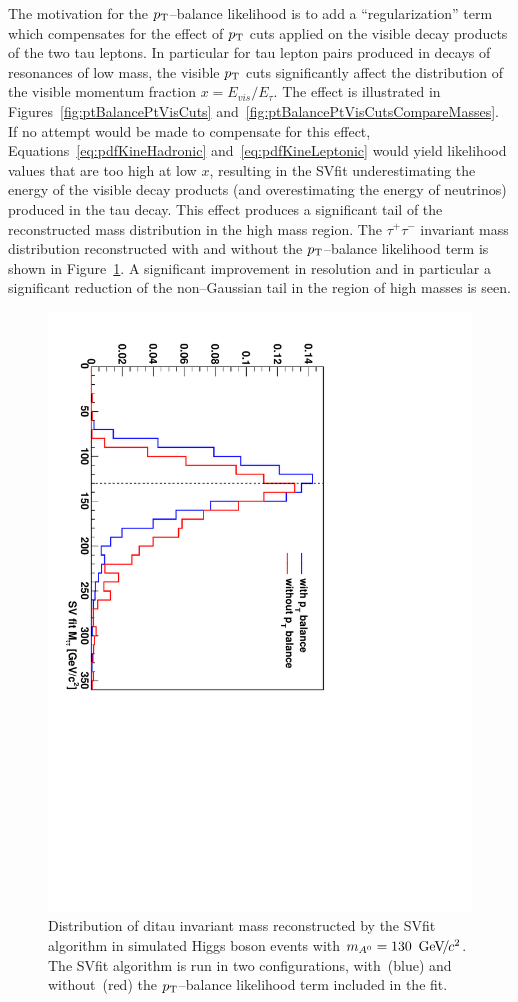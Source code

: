 The motivation for the $p_{\mathrm{T}}$--balance likelihood is to add a ``regularization''
term which compensates for the effect of $p_{\mathrm{T}}$ cuts applied on the visible decay
products of the two tau leptons.  In particular for tau lepton pairs produced in
decays of resonances of low mass, the visible $p_{\mathrm{T}}$ cuts significantly affect
the distribution of the visible momentum fraction \mbox{$x =
E_{vis}/{E_{\tau}}$}.  The effect is illustrated in
Figures~\ref{fig:ptBalancePtVisCuts}
and~\ref{fig:ptBalancePtVisCutsCompareMasses}.  If no attempt would be made to
compensate for this effect, Equations~\ref{eq:pdfKineHadronic}
and~\ref{eq:pdfKineLeptonic} would yield likelihood values that are too high at
low $x$, resulting in the SVfit underestimating the energy of the visible decay
products (and overestimating the energy of neutrinos) produced in the tau decay.
This effect produces a significant tail of the reconstructed mass distribution
in the high mass region.  The $\tau^{+} \tau^{-}$ invariant mass distribution
reconstructed with and without the $p_{\mathrm{T}}$--balance likelihood term is shown in
Figure~\ref{fig:ptBalanceImprovedMassResolution}.  A significant improvement in
resolution and in particular a significant reduction of the non--Gaussian tail
in the region of high masses is seen.

\begin{figure}[t]
\begin{center}
\includegraphics*[height=0.75\textwidth, angle=90]{svfit_chapter/figures/pt_balance_effect.pdf} \caption[Effect of
\pt--balance term on SVfit performance]{\captiontext Distribution of ditau
invariant mass reconstructed by the SVfit algorithm in simulated Higgs boson events
with \mbox{$m_{A^0} = 130~{\,\text{Ge\hspace{-.08em}V\hspace{-0.16em}/\hspace{-0.08em}}c^\text{2}}$}.  The SVfit algorithm is run in two
configurations, with~(blue) and without~(red) the $p_{\mathrm{T}}$--balance likelihood term
included in the fit. 
} \label{fig:ptBalanceImprovedMassResolution}
\end{center}
\end{figure} 

